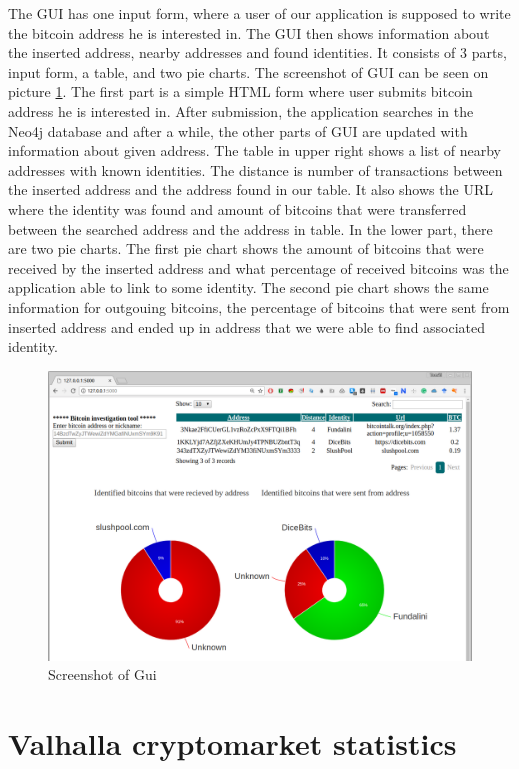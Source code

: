 \documentclass[
  digital, %
  table,   %
  lof,     %
  lot,     %
  oneside
]{fithesis3}
\begin{document}
The GUI has one input form, where a user of our application is supposed to write the bitcoin address he is interested in.
The GUI then shows information about the inserted address, nearby addresses and found identities.
It consists of 3 parts, input form, a table, and two pie charts. The screenshot of GUI can be seen on picture \ref{guiscreen}.
The first part is a simple HTML form where user submits bitcoin address he is interested in.
After submission, the application searches in the Neo4j database and after a while,
the other parts of GUI are updated with information about given address.
The table in upper right shows a list of nearby addresses with known identities. The distance is number of transactions
between the inserted address and the address found in our table. It also shows the URL where the identity was found
and amount of bitcoins that were transferred between the searched address and the address in table.
In the lower part, there are two pie charts. The first pie chart shows the amount of bitcoins that were received by the inserted address
and what percentage of received bitcoins was the application able to link to some identity.
The second pie chart shows the same information for outgouing bitcoins, the percentage of bitcoins that were sent from inserted address
and ended up in address that we were able to find associated identity.

\begin{figure}[!htb]
\hspace*{-1cm}
    \centering
    \includegraphics[width=1\textwidth]{shot}
    \caption{Screenshot of Gui}
    \label{guiscreen}
\end{figure}

\chapter{Valhalla cryptomarket statistics}
\label{stats}
\end{document}
